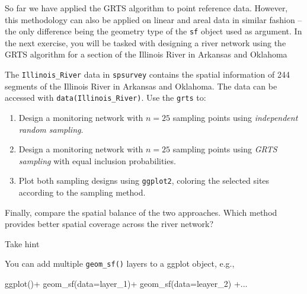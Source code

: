 \documentclass[
  letterpaper,
  DIV=11,
  numbers=noendperiod]{scrartcl}
\newenvironment{Shaded}{\begin{snugshade}}{\end{snugshade}}
\newcommand{\AttributeTok}[1]{\textcolor[rgb]{0.40,0.45,0.13}{#1}}
\newcommand{\FunctionTok}[1]{\textcolor[rgb]{0.28,0.35,0.67}{#1}}
\newcommand{\NormalTok}[1]{\textcolor[rgb]{0.00,0.23,0.31}{#1}}
\newcommand{\SpecialCharTok}[1]{\textcolor[rgb]{0.37,0.37,0.37}{#1}}
\begin{document}
So far we have applied the GRTS algorithm to point reference data.
However, this methodology can also be applied on linear and areal data
in similar fashion -- the only difference being the geometry type of the
\texttt{sf} object used as argument. In the next exercise, you will be
tasked with designing a river network using the GRTS algorithm for a
section of the Illinois River in Arkansas and Oklahoma

\begin{tcolorbox}[enhanced jigsaw, colbacktitle=quarto-callout-warning-color!10!white, toprule=.15mm, breakable, coltitle=black, opacityback=0, toptitle=1mm, arc=.35mm, titlerule=0mm, bottomtitle=1mm, title={Task 4}, rightrule=.15mm, bottomrule=.15mm, colback=white, colframe=quarto-callout-warning-color-frame, opacitybacktitle=0.6, left=2mm, leftrule=.75mm]

The \texttt{Illinois\_River} data in \texttt{spsurvey} contains the
spatial information of 244 segments of the Illinois River in Arkansas
and Oklahoma. The data can be accessed with
\texttt{data(Illinois\_River)}. Use the \texttt{grts} to:

\begin{enumerate}
\def\labelenumi{\arabic{enumi}.}
\item
  Design a monitoring network with \(n=25\) sampling points using
  \emph{independent random sampling}.
\item
  Design a monitoring network with \(n=25\) sampling points using
  \emph{GRTS sampling} with equal inclusion probabilities.
\item
  Plot both sampling designs using \texttt{ggplot2}, coloring the
  selected sites according to the sampling method.
\end{enumerate}

Finally, compare the spatial balance of the two approaches. Which method
provides better spatial coverage across the river network?

Take hint

You can add multiple \texttt{geom\_sf()} layers to a ggplot object,
e.g.,

\begin{Shaded}
\begin{Highlighting}[]
\FunctionTok{ggplot}\NormalTok{()}\SpecialCharTok{+}
\FunctionTok{geom\_sf}\NormalTok{(}\AttributeTok{data=}\NormalTok{layer\_1)}\SpecialCharTok{+}
\FunctionTok{geom\_sf}\NormalTok{(}\AttributeTok{data=}\NormalTok{leayer\_2) }\SpecialCharTok{+}\NormalTok{...}
\end{Highlighting}
\end{Shaded}


\end{tcolorbox}
\end{document}

